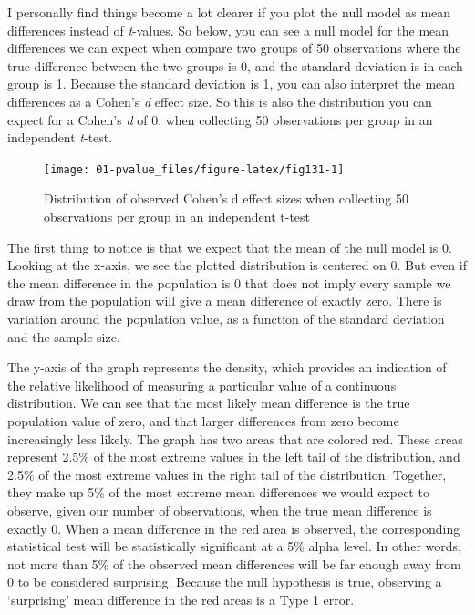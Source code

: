 \documentclass[
  oneside]{book}
\begin{document}
I personally find things become a lot clearer if you plot the null model as mean differences instead of \emph{t}-values. So below, you can see a null model for the mean differences we can expect when compare two groups of 50 observations where the true difference between the two groups is 0, and the standard deviation is in each group is 1. Because the standard deviation is 1, you can also interpret the mean differences as a Cohen's \emph{d} effect size. So this is also the distribution you can expect for a Cohen's \emph{d} of 0, when collecting 50 observations per group in an independent \emph{t}-test.

\begin{figure}

{\centering \texttt{[image: 01-pvalue\_files/figure-latex/fig131-1]} 

}

\caption{Distribution of observed Cohen's d effect sizes when collecting 50 observations per group in an independent t-test}\label{fig:fig131}
\end{figure}

The first thing to notice is that we expect that the mean of the null model is 0. Looking at the x-axis, we see the plotted distribution is centered on 0. But even if the mean difference in the population is 0 that does not imply every sample we draw from the population will give a mean difference of exactly zero. There is variation around the population value, as a function of the standard deviation and the sample size.

The y-axis of the graph represents the density, which provides an indication of the relative likelihood of measuring a particular value of a continuous distribution. We can see that the most likely mean difference is the true population value of zero, and that larger differences from zero become increasingly less likely. The graph has two areas that are colored red. These areas represent 2.5\% of the most extreme values in the left tail of the distribution, and 2.5\% of the most extreme values in the right tail of the distribution. Together, they make up 5\% of the most extreme mean differences we would expect to observe, given our number of observations, when the true mean difference is exactly 0. When a mean difference in the red area is observed, the corresponding statistical test will be statistically significant at a 5\% alpha level. In other words, not more than 5\% of the observed mean differences will be far enough away from 0 to be considered surprising. Because the null hypothesis is true, observing a `surprising' mean difference in the red areas is a Type 1 error.
\end{document}
